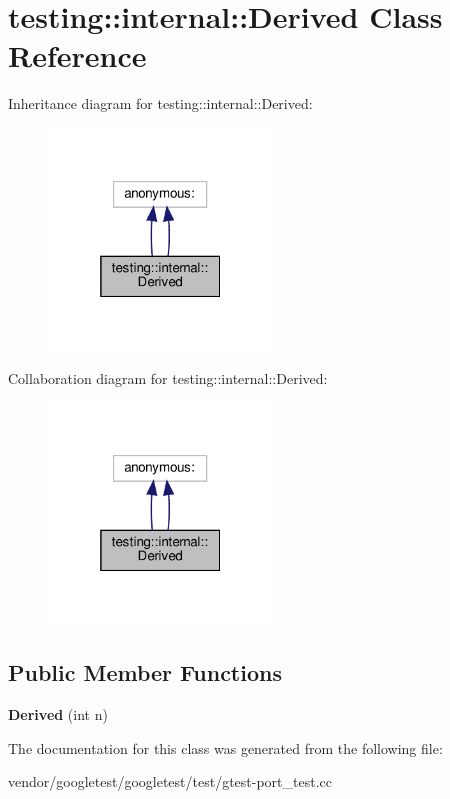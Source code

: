 \hypertarget{classtesting_1_1internal_1_1_derived}{}\section{testing\+:\+:internal\+:\+:Derived Class Reference}
\label{classtesting_1_1internal_1_1_derived}


Inheritance diagram for testing\+:\+:internal\+:\+:Derived\+:
\nopagebreak
\begin{figure}[H]
\begin{center}
\leavevmode
\includegraphics[width=169pt]{classtesting_1_1internal_1_1_derived__inherit__graph}
\end{center}
\end{figure}


Collaboration diagram for testing\+:\+:internal\+:\+:Derived\+:
\nopagebreak
\begin{figure}[H]
\begin{center}
\leavevmode
\includegraphics[width=169pt]{classtesting_1_1internal_1_1_derived__coll__graph}
\end{center}
\end{figure}
\subsection*{Public Member Functions}
\begin{DoxyCompactItemize}
\item 
\mbox{\label{classtesting_1_1internal_1_1_derived_a05a8e8354c7c09a9f3728a96c96f1edd}} 
{\bfseries Derived} (int n)
\end{DoxyCompactItemize}


The documentation for this class was generated from the following file\+:\begin{DoxyCompactItemize}
\item 
vendor/googletest/googletest/test/gtest-\/port\+\_\+test.\+cc\end{DoxyCompactItemize}
